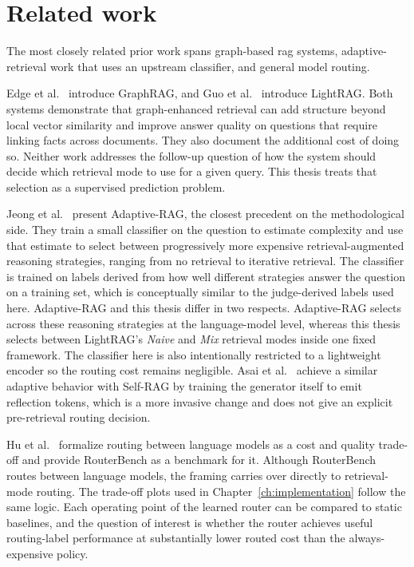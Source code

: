 \documentclass[english, bibtex]{kththesis}               %
\numberwithin{listing}{chapter}
\begin{document}
\section{Related work}
\label{sec:relatedWork}

The most closely related prior work spans graph-based \gls{rag} systems, adaptive-retrieval work that uses an upstream classifier, and general model routing.

Edge et al.\ \cite{edge2024graphrag} introduce GraphRAG, and Guo et al.\ \cite{lightrag2024} introduce LightRAG. Both systems demonstrate that graph-enhanced retrieval can add structure beyond local vector similarity and improve answer quality on questions that require linking facts across documents. They also document the additional cost of doing so. Neither work addresses the follow-up question of how the system should decide which retrieval mode to use for a given query. This thesis treats that selection as a supervised prediction problem.

Jeong et al.\ \cite{jeong2024adaptiverag} present Adaptive-RAG, the closest precedent on the methodological side. They train a small classifier on the question to estimate complexity and use that estimate to select between progressively more expensive retrieval-augmented reasoning strategies, ranging from no retrieval to iterative retrieval. The classifier is trained on labels derived from how well different strategies answer the question on a training set, which is conceptually similar to the judge-derived labels used here. Adaptive-RAG and this thesis differ in two respects. Adaptive-RAG selects across these reasoning strategies at the language-model level, whereas this thesis selects between LightRAG's \emph{Naive} and \emph{Mix} retrieval modes inside one fixed framework. The classifier here is also intentionally restricted to a lightweight encoder so the routing cost remains negligible. Asai et al.\ \cite{asai2023selfrag} achieve a similar adaptive behavior with Self-RAG by training the generator itself to emit reflection tokens, which is a more invasive change and does not give an explicit pre-retrieval routing decision.

Hu et al.\ \cite{hu2024routerbench} formalize routing between language models as a cost and quality trade-off and provide RouterBench as a benchmark for it. Although RouterBench routes between language models, the framing carries over directly to retrieval-mode routing. The trade-off plots used in Chapter~\ref{ch:implementation} follow the same logic. Each operating point of the learned router can be compared to static baselines, and the question of interest is whether the router achieves useful routing-label performance at substantially lower routed cost than the always-expensive policy.
\end{document}
